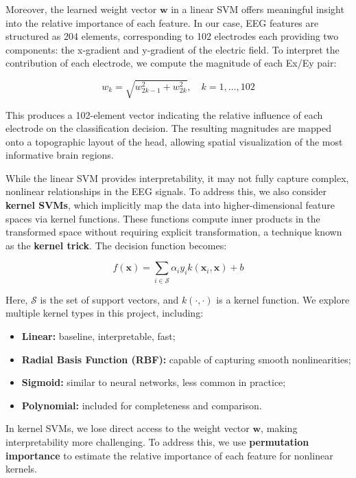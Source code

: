 \documentclass[
  letterpaper,
  DIV=11,
  numbers=noendperiod]{scrartcl}
\providecommand{\tightlist}{%
  \setlength{\itemsep}{0pt}\setlength{\parskip}{0pt}}\usepackage{longtable,booktabs,array}
\begin{document}
Moreover, the learned weight vector \(\mathbf{w}\) in a linear SVM
offers meaningful insight into the relative importance of each feature.
In our case, EEG features are structured as 204 elements, corresponding
to 102 electrodes each providing two components: the x-gradient and
y-gradient of the electric field. To interpret the contribution of each
electrode, we compute the magnitude of each Ex/Ey pair:

\[
w_k = \sqrt{w_{2k-1}^2 + w_{2k}^2}, \quad k = 1, \dots, 102
\]

This produces a 102-element vector indicating the relative influence of
each electrode on the classification decision. The resulting magnitudes
are mapped onto a topographic layout of the head, allowing spatial
visualization of the most informative brain regions.

While the linear SVM provides interpretability, it may not fully capture
complex, nonlinear relationships in the EEG signals. To address this, we
also consider \textbf{kernel SVMs}, which implicitly map the data into
higher-dimensional feature spaces via kernel functions. These functions
compute inner products in the transformed space without requiring
explicit transformation, a technique known as the \textbf{kernel trick}.
The decision function becomes:

\[
f(\mathbf{x}) = \sum_{i \in \mathcal{S}} \alpha_i y_i k(\mathbf{x}_i, \mathbf{x}) + b
\]

Here, \(\mathcal{S}\) is the set of support vectors, and
\(k(\cdot, \cdot)\) is a kernel function. We explore multiple kernel
types in this project, including:

\begin{itemize}
\tightlist
\item
  \textbf{Linear:} baseline, interpretable, fast;
\item
  \textbf{Radial Basis Function (RBF):} capable of capturing smooth
  nonlinearities;
\item
  \textbf{Sigmoid:} similar to neural networks, less common in practice;
\item
  \textbf{Polynomial:} included for completeness and comparison.
\end{itemize}

In kernel SVMs, we lose direct access to the weight vector
\(\mathbf{w}\), making interpretability more challenging. To address
this, we use \textbf{permutation importance} to estimate the relative
importance of each feature for nonlinear kernels.
\end{document}
